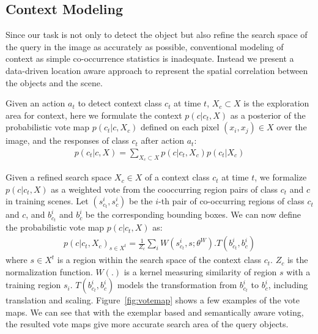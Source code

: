 


\subsection{Context Modeling}
\label{sec:context}
Since our task is not only to detect the object but also refine the search space of the query in the image as accurately as possible, conventional modeling of context as simple co-occurrence statistics is inadequate. Instead we present a data-driven location aware approach to represent the spatial correlation between the objects and the scene. 

Given an action $a_t$ to detect context class $c_t$ at time $t$, $X_c \subset X$ is the exploration area for context, here we formulate the context $p(c|c_t,X)$ as a posterior of the probabilistic vote map $p(c_t|c,X_c)$ defined on each pixel $(x_i,x_j)\in X$ over the image, and the responses of class $c_t$ after action $a_t$:
\begin{eqnarray}
p(c_t|c,X) = \sum_{X_c \subset X} p(c|c_t,X_c)p(c_t|X_c)
\end{eqnarray}

Given a refined search space $X_c\in X$ of a context class $c_t$ at time $t$, we formalize $p(c|c_t,X)$ as a weighted vote from the cooccurring region pairs of class $c_t$ and $c$ in training scenes. Let $(s_{c_t}^i, s_c^i)$ be the $i$-th pair of co-occurring regions of class $c_t$ and $c$, and $b_{c_t}^i$ and $b_c^i$ be the corresponding bounding boxes. We can now define the probabilistic vote map $p(c|c_t,X)$ as:
\begin{eqnarray}
\label{eq:votemap}
p(c|c_t,X_c)_{s\in X^t} = \frac{1}{Z_c}\sum_i W(s_{c_t}^i,s;\theta^W).T(b_{c_t}^i,b_c^i)
\end{eqnarray}
where $s\in X^t$ is a region within the search space of the context class $c_t$. $Z_c$ is the normalization function. $W(.)$ is a kernel measuring similarity of region $s$ with a training region $s_i$. $T(b_{c_t}^i,b_c^i)$ models the transformation from $b_{c_t}^i$ to $b_c^i$, including translation and scaling. Figure~\ref{fig:votemap} shows a few examples of the vote maps. We can see that with the exemplar based and semantically aware voting, the resulted vote maps give more accurate search area of the query objects.


